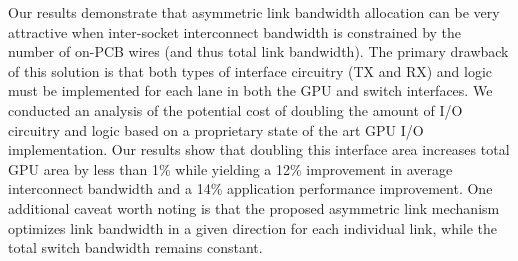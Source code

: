 Our results demonstrate that asymmetric link bandwidth
allocation can be very attractive when inter-socket interconnect bandwidth is constrained 
by the number of on-PCB wires (and thus total link bandwidth).
The primary drawback of this solution is that both types of interface circuitry (TX and RX)
and logic must be implemented for each lane in both the GPU and switch interfaces.
We conducted an analysis of the potential cost of doubling the amount
of I/O circuitry and logic based on a proprietary state of
the art GPU I/O implementation. Our results show that doubling this interface area
increases total GPU area by less than 1\% while yielding a 12\% improvement in average
interconnect bandwidth and a 14\% application performance improvement.  
One additional caveat worth noting is that the proposed asymmetric link
mechanism optimizes link bandwidth in a given direction for each individual
link, while the total switch bandwidth remains constant.
 




